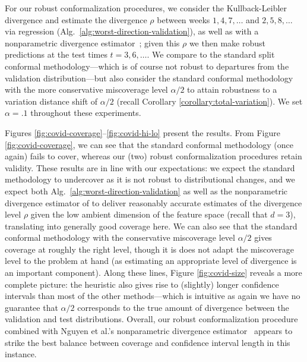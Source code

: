 For our robust conformalization procedures, we consider the Kullback-Leibler
divergence and estimate the divergence $\rho$ between weeks $1,4,7,\ldots$
and $2,5,8,\ldots$ via regression
(Alg.~\ref{alg:worst-direction-validation}), as well as with a nonparametric
divergence estimator~\citep{NguyenWaJo10}; given this $\rho$ we then make
robust predictions at the test times $t = 3, 6, \ldots$.  We compare to the
standard split conformal methodology---which is of course not robust to
departures from the validation distribution---but also consider the standard
conformal methodology with the more conservative miscoverage level
$\alpha/2$ to attain robustness to a variation distance shift of $\alpha/2$
(recall Corollary \ref{corollary:total-variation}).  We set $\alpha = .1$
throughout these experiments.


Figures \ref{fig:covid-coverage}--\ref{fig:covid-hi-lo} present the results.  From Figure \ref{fig:covid-coverage}, we can see that the standard conformal methodology (once again) fails to cover, whereas our (two) robust conformalization procedures retain validity.  These results are in line with our expectations: we expect the standard methodology to undercover as it is not robust to distributional changes, and we expect both Alg.~\ref{alg:worst-direction-validation} as well as the nonparametric divergence estimator of \citet{NguyenWaJo10} to deliver reasonably accurate estimates of the divergence level $\rho$ given the low ambient dimension of the feature space (recall that $d=3$), translating into generally good coverage here.  We can also see that the standard conformal methodology with the conservative miscoverage level $\alpha/2$ gives coverage at roughly the right level, though it is does not adapt the miscoverage level to the problem at hand (as estimating an appropriate level of divergence is an important component).  Along these lines, Figure \ref{fig:covid-size} reveals a more complete picture: the heuristic also gives rise to (slightly) longer confidence intervals than most of the other methods---which is intuitive as again we have no guarantee that $\alpha/2$ corresponds to the true amount of divergence between the validation and test distributions.  Overall, our robust conformalization procedure combined with Nguyen et al.'s  nonparametric divergence estimator~\citep{NguyenWaJo10} appears to strike the best balance between coverage and confidence interval length in this instance.

